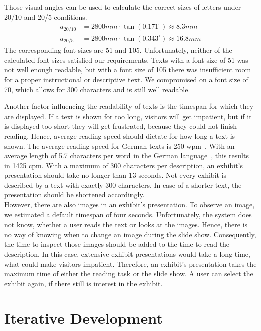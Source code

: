 Those visual angles can be used to calculate the correct sizes of letters under 20/10 and 20/5 conditions.
\begin{align*}
	a_{20/10} &= 2800mm \cdot \tan{(0.171^\circ)} \approx 8.3mm
	\\
	a_{20/5} &= 2800mm \cdot \tan{(0.343^\circ)} \approx 16.8mm
\end{align*}
The corresponding font sizes are 51 and 105. Unfortunately, neither of the calculated font sizes satisfied our requirements. Texts with a font size of 51 was not well enough readable, but with a font size of 105 there was insufficient room for a proper instructional or descriptive text. We compromised on a font size of 70, which allows for 300 characters and is still well readable.

Another factor influencing the readability of texts is the timespan for which they are displayed. If a text is shown for too long, visitors will get impatient, but if it is displayed too short they will get frustrated, because they could not finish reading. Hence, average reading speed should dictate for how long a text is shown. The average reading speed for German texts is 250 \ac{wpm}~\cite{Lesegeschwindigkeit}. With an average length of 5.7 characters per word in the German language~\cite{Wortlaenge}, this results in 1425 \ac{cpm}. With a maximum of 300 characters per description, an exhibit's presentation should take no longer than 13 seconds. Not every exhibit is described by a text with exactly 300 characters. In case of a shorter text, the presentation should be shortened accordingly. 
\\
However, there are also images in an exhibit's presentation. To observe an image, we estimated a default timespan of four seconds. Unfortunately, the system does not know, whether a user reads the text or looks at the images. Hence, there is no way of knowing when to change an image during the slide show. Consequently, the time to inspect those images should be added to the time to read the description. In this case, extensive exhibit presentations would take a long time, what could make visitors impatient. Therefore, an exhibit's presentation takes the maximum time of either the reading task or the slide show. A user can select the exhibit again, if there still is interest in the exhibit.


\section{Iterative Development}
\label{installation_testing}

